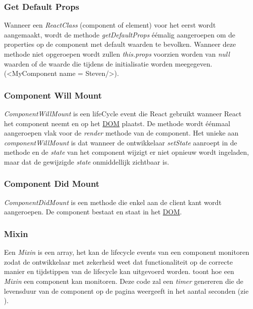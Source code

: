 	\subsubsection{Get Default Props}
		
		Wanneer een \emph{ReactClass} (component of element) voor het eerst wordt aangemaakt, wordt de methode \emph{getDefaultProps} éémalig aangeroepen om de properties op de component met default waarden te bevolken. Wanneer deze methode niet opgeroepen wordt zullen \emph{this.props} voorzien worden van \emph{null} waarden of de waarde die tijdens de initialisatie worden meegegeven. (<MyComponent name = \textquotedbl Steven\textquotedbl />).
	
	\subsubsection{Component Will Mount}
		
		\emph{ComponentWillMount} is een lifeCycle event die React gebruikt wanneer React het component neemt en op het \hyperref[dom]{DOM} plaatst. De methode wordt éénmaal aangeroepen vlak voor de \emph{render} methode van de component. Het unieke aan \emph{componentWillMount} is dat wanneer de ontwikkelaar \emph{setState} aanroept in de methode en de \emph{state} van het component wijzigt er niet opnieuw wordt ingeladen, maar dat de gewijzigde \emph{state} onmiddellijk zichtbaar is.
	
	\subsubsection{Component Did Mount}
		
		\emph{ComponentDidMount} is een methode die enkel aan de client kant wordt aangeroepen. De component bestaat en staat in het \hyperref[dom]{DOM}.
	
	\subsubsection{Mixin}
		
		Een \emph{Mixin} is een array, het kan de lifecycle events van een component monitoren zodat de ontwikkelaar met zekerheid weet dat functionaliteit op de correcte manier en tijdstippen van de lifecycle kan uitgevoerd worden.  toont hoe een \emph{Mixin} een component kan monitoren. Deze code zal een \emph{timer} genereren die de levensduur van de component op de pagina weergeeft in het aantal seconden (zie ).
		

